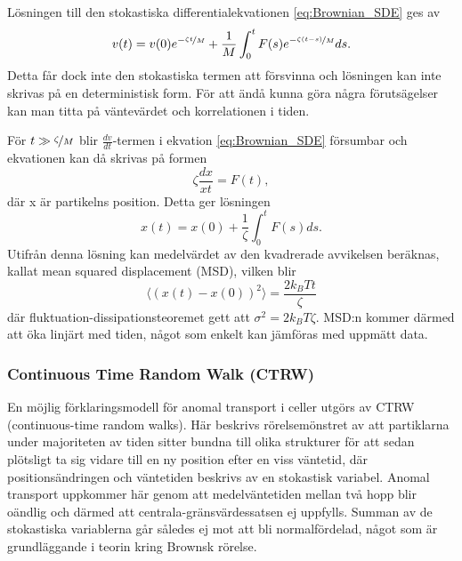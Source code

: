Lösningen till den stokastiska differentialekvationen \eqref{eq:Brownian_SDE} ges av 
\begin{equation}
    v(t)=v(0)e^{-\nicefrac{\zeta t}{M}}+\frac{1}{M}\int^t_0 F(s)e^{-\nicefrac{\zeta (t-s)}{M}}ds.
\end{equation}
Detta får dock inte den stokastiska termen att försvinna och lösningen kan inte skrivas på en deterministisk form. För att ändå kunna göra några förutsägelser kan man titta på väntevärdet och korrelationen i tiden.

För $t \gg \nicefrac{\zeta}{M}$ blir $\frac{dv}{dt}$-termen i ekvation \eqref{eq:Brownian_SDE} försumbar  och ekvationen kan då skrivas på formen
\begin{equation}
    \zeta \frac{dx}{xt}=F(t),
\end{equation}
där x är partikelns position. Detta ger lösningen
\begin{equation}
    x(t)=x(0)+\frac{1}{\zeta} \int^t_0 F(s)ds.
\end{equation}
Utifrån denna lösning kan medelvärdet av den kvadrerade avvikelsen beräknas, kallat mean squared displacement (MSD), vilken blir 
\begin{equation}
    \langle{(x(t)-x(0))^2}\rangle{}=\frac{2k_BTt}{\zeta}
\end{equation}
där fluktuation-dissipationsteoremet gett att $\sigma^2=2k_BT\zeta$.  MSD:n kommer därmed att öka linjärt med tiden, något som enkelt kan jämföras med uppmätt data.



\subsubsection{Continuous Time Random Walk (CTRW)}

 En möjlig förklaringsmodell för anomal transport i celler utgörs av CTRW (continuous-time random walks). Här beskrivs rörelsemönstret av att partiklarna under majoriteten av tiden sitter bundna till olika strukturer för att sedan plötsligt ta sig vidare till en ny position efter en viss väntetid, där positionsändringen och väntetiden beskrivs av en stokastisk variabel. \cite{Hofling_Franosch}
 Anomal transport uppkommer här genom att medelväntetiden mellan två hopp blir oändlig och därmed att centrala-gränsvärdessatsen ej uppfylls. Summan av de stokastiska variablerna går således ej mot att bli normalfördelad, något som är grundläggande i teorin kring Brownsk rörelse.

